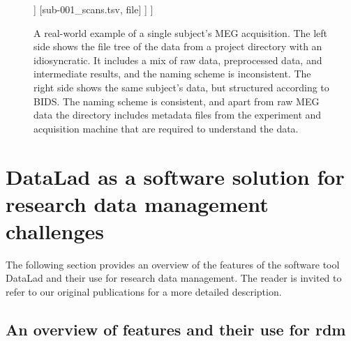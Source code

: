 \begin{figure}
{\begin{minipage}{.49\textwidth}
\begin{forest}
		]
		[sub-001\_scans.tsv, file]
		]
		]
	\end{forest}
\end{minipage}
}
\caption[An example of BIDS]{A real-world example of a single subject's MEG acquisition. The left side shows the file tree of the data from a project directory with an idiosyncratic. It includes a mix of raw data, preprocessed data, and intermediate results, and the naming scheme is inconsistent. The right side shows the same subject's data, but structured according to \gls{BIDS}. The naming scheme is consistent, and apart from raw MEG data the directory includes metadata files from the experiment and acquisition machine that are required to understand the data.}
\label{fig:BIDS}
\end{figure}


\pagebreak

\section{DataLad as a software solution for research data management challenges}

The following section provides an overview of the features of the software tool DataLad and their use for research data management.
The reader is invited to refer to our original publications \citep{Halchenko2021} \citep{wagner2020datalad} for a more detailed description.

\subsection{An overview of features and their use for \gls{rdm}}

